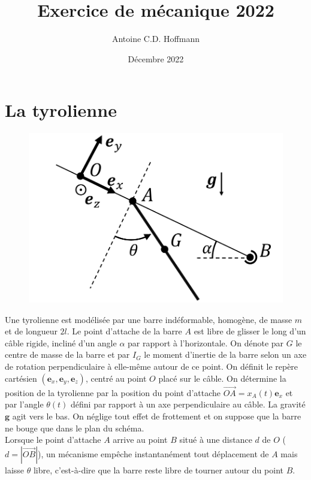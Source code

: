 \documentclass[11pt,a4paper]{exam}
\title{Exercice de mécanique 2022}
\date{Décembre 2022}
\author{Antoine C.D. Hoffmann}
\newcommand{\exACDH}{\bm e_x}
\newcommand{\eyACDH}{\bm e_y}
\newcommand{\ezACDH}{\bm e_z}
\begin{document}
\section*{La tyrolienne}



\begin{figure}
    \centering
    \includegraphics[width=0.55\linewidth]{ExoFig/tyr_schema.pdf}
\end{figure}
Une tyrolienne est modélisée par une barre indéformable, homogène, de masse $m$ et de longueur $2l$.
Le point d'attache de la barre $A$ est libre de glisser le long d'un câble rigide, incliné d'un angle $\alpha$ par rapport à l'horizontale. 
On dénote par $G$ le centre de masse de la barre et par $I_G$ le moment d'inertie de la barre selon un axe de rotation perpendiculaire à elle-même autour de ce point. 
On définit le repère cartésien $(\exACDH, \eyACDH, \ezACDH)$, centré au point $O$ placé sur le câble.
On détermine la position de la tyrolienne par la position du point d'attache $\overrightarrow{OA}=x_A(t) \exACDH$ et par l'angle $\theta(t)$ défini par rapport à un axe perpendiculaire au câble.
La gravité $\bm g$ agit vers le bas. On néglige tout effet de frottement et on suppose que la barre ne bouge que dans le plan du schéma.\\
Lorsque le point d'attache $A$ arrive au point $B$ situé à une distance $d$ de $O$ ($d=|\overrightarrow{OB}|$), un mécanisme empêche instantanément tout déplacement de $A$ mais laisse $\theta$ libre, c'est-à-dire que la barre reste libre de tourner autour du point $B$.
%
\end{document}
